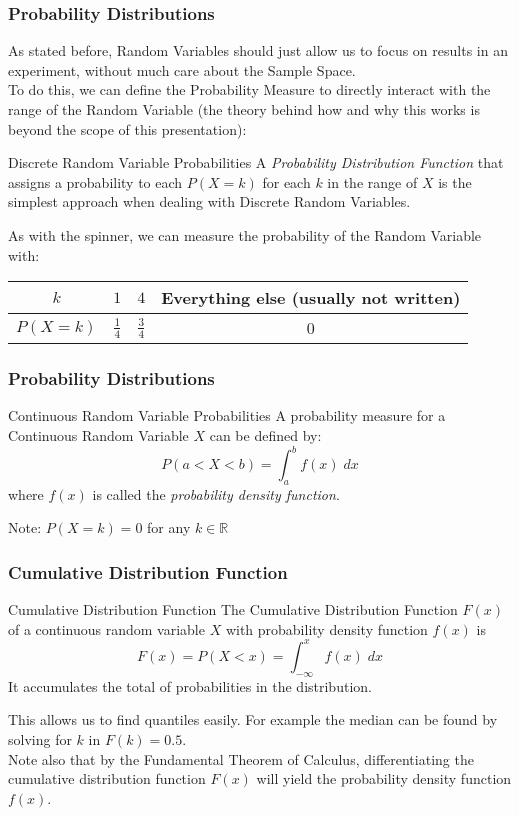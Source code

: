 \documentclass{beamer}
\begin{document}
\begin{frame}
  \frametitle{Probability Distributions}
  As stated before, Random Variables should just allow us to focus on results in an experiment, without much care about the Sample Space.\\
  \pause
  To do this, we can define the Probability Measure to directly interact with the range of the Random Variable (the theory behind how and why this works is beyond the scope of this presentation):
  \pause
  \begin{block}{Discrete Random Variable Probabilities}
    A \emph{Probability Distribution Function} that assigns a probability to each $P(X=k)$ for each $k$ in the range of $X$ is the simplest approach when dealing with Discrete Random Variables.
  \end{block}
  \pause
  \begin{example}
    As with the spinner, we can measure the probability of the Random Variable with:
    \begin{tabular}{|c|c|c|c|}\hline
      $k$ & $1$ & $4$ & Everything else (usually not written)\\ \hline
      $P(X=k)$ & $\frac{1}{4}$ & $\frac{3}{4}$ & 0\\ \hline
    \end{tabular}
  \end{example}
\end{frame}

\begin{frame}
  \frametitle{Probability Distributions}
  \begin{block}{Continuous Random Variable Probabilities}
    A probability measure for a Continuous Random Variable $X$ can be defined by:
    \[ P(a < X < b) = \int_a^b f(x)\;dx \]
    where $f(x)$ is called the \emph{probability density function}.
  \end{block}
  Note: $P(X = k) = 0$ for any $k \in \mathbb{R}$
\end{frame}

\begin{frame}
  \frametitle{Cumulative Distribution Function}
  \begin{block}{Cumulative Distribution Function}
    The Cumulative Distribution Function $F(x)$ of a continuous random variable $X$ with probability density function $f(x)$ is
    \[ F(x) = P(X < x) = \int_{-\infty}^x f(x)\;dx \]
    It accumulates the total of probabilities in the distribution.
  \end{block}
  \pause
  This allows us to find quantiles easily. For example the median can be found by solving for $k$ in $F(k) = 0.5$.\\
  \pause
  Note also that by the Fundamental Theorem of Calculus, differentiating the cumulative distribution function $F(x)$ will yield the probability density function $f(x)$.
\end{frame}
\end{document}
